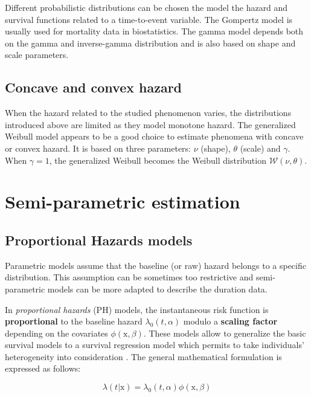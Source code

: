 \documentclass[
]{book}
\begin{document}
Different probabilistic distributions can be chosen the model the hazard and survival functions related to a time-to-event variable. The Gompertz model is usually used for mortality data in biostatistics. The gamma model depends both on the gamma and inverse-gamma distribution and is also based on shape and scale parameters.

\hypertarget{concave-and-convex-hazard}{%
\subsection{Concave and convex hazard}\label{concave-and-convex-hazard}}

When the hazard related to the studied phenomenon varies, the distributions introduced above are limited as they model monotone hazard. The generalized Weibull model appears to be a good choice to estimate phenomena with concave or convex hazard. It is based on three parameters: \(\nu\) (shape), \(\theta\) (scale) and \(\gamma\). When \(\gamma = 1\), the generalized Weibull becomes the Weibull distribution \(\mathcal{W}(\nu, \theta)\).

\hypertarget{semi-parametric-estimation}{%
\section{Semi-parametric estimation}\label{semi-parametric-estimation}}

\hypertarget{proportional-hazards-models}{%
\subsection{Proportional Hazards models}\label{proportional-hazards-models}}

Parametric models assume that the baseline (or raw) hazard belongs to a specific distribution. This assumption can be sometimes too restrictive and semi-parametric models can be more adapted to describe the duration data.

In \emph{proportional hazards} (PH) models, the instantaneous risk function is \textbf{proportional} to the baseline hazard \(\lambda_0 (t,\alpha)\) modulo a \textbf{scaling factor} depending on the covariates \(\phi(\pmb{\mathrm{x}}, \beta)\). These models allow to generalize the basic survival models to a survival regression model which permits to take individuals' heterogeneity into consideration \citep{RMS}. The general mathematical formulation is expressed as follows:

\begin{equation}
    \lambda(t|\pmb{\mathrm{x}}) = \lambda_0 (t,\alpha)  \phi(\pmb{\mathrm{x}}, \beta) 
    \label{eq:ph}
\end{equation}
\end{document}
